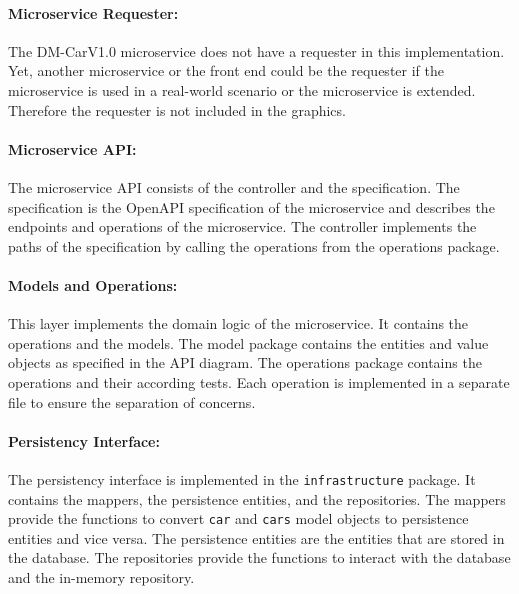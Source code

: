 \paragraph*{Microservice Requester:}
The DM-CarV1.0 microservice does not have a requester in this implementation.
Yet, another microservice or the front end could be the requester if the microservice is used in a real-world scenario or the microservice is extended.
Therefore the requester is not included in the graphics.

\paragraph*{Microservice API:}
The microservice API consists of the controller and the specification.
The specification is the OpenAPI specification of the microservice and describes the endpoints and operations of the microservice.
The controller implements the paths of the specification by calling the operations from the operations package.

\paragraph*{Models and Operations:}
This layer implements the domain logic of the microservice.
It contains the operations and the models.
The model package contains the entities and value objects as specified in the API diagram.
The operations package contains the operations and their according tests.
Each operation is implemented in a separate file to ensure the separation of concerns.

\paragraph*{Persistency Interface:}
The persistency interface is implemented in the \texttt{infrastructure} package.
It contains the mappers, the persistence entities, and the repositories.
The mappers provide the functions to convert \texttt{car} and \texttt{cars} model objects to persistence entities and vice versa.
The persistence entities are the entities that are stored in the database.
The repositories provide the functions to interact with the database and the in-memory repository.

